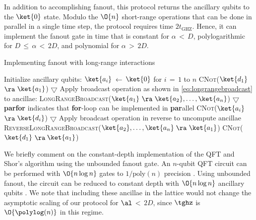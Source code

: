 In addition to accomplishing fanout, this protocol returns the ancillary qubits to the $\ket{0}$ state.
Modulo the $\O{n}$ short-range operations that can be done in parallel in a single time step, the protocol requires time $2 t_\mathrm{GHZ}$.
Hence, it can implement the fanout gate in time that is constant for $\alpha$\,$<$\,$D$, polylogarithmic for $D$\,$\le$\,$\alpha$\,$<$\,$2D$, and polynomial for $\alpha$\,$>$\,$2D$.

\begin{algorithm}[H]
  \caption{Implementing fanout with long-range interactions}
  \label{alg:fastfanout}
  \begin{algorithmic}[1]
   \State Initialize ancillary qubits: $\ket{a_i}$\,$\gets$\,$\ket{0}$ for $i$\,$=$\,$1$ to $n$
  \State \textsc{CNot}($\ket{d_1}$\,$\ra$\,$\ket{a_1}$)
  \Statex $\bigtriangledown$ Apply broadcast operation as shown in \cref{eq:longrangebroadcast} to ancillae:
  \State \textsc{LongRangeBroadcast}($\ket{a_1}$\,$\ra$\,$\ket{a_2},\dots,\ket{a_n}$)
  \Statex $\bigtriangledown$ \textbf{parfor} indicates that \textbf{for}-loop can be implemented in \textbf{par}allel
    \State \textsc{CNot}($\ket{a_i}$\,$\ra$\,$\ket{d_{i}}$)
  \EndParFor
  \Statex $\bigtriangledown$ Apply broadcast operation in reverse to uncompute ancillae
  \State \textsc{ReverseLongRangeBroadcast}($\ket{a_2},\dots,\ket{a_n}$\,$\ra$\,$\ket{a_1}$)
  \State \textsc{CNot}($\ket{d_1}$\,$\ra$\,$\ket{a_1}$)
  \end{algorithmic}
\end{algorithm}

We briefly comment on the constant-depth implementation of the QFT and Shor's algorithm using the unbounded fanout gate.
An $n$-qubit QFT circuit can be performed with $\O{n\log n}$ gates to $1/\text{poly}(n)$ precision \cite{Coppersmith94}.
Using unbounded fanout, the circuit can be reduced to constant depth with $\O{n\log n}$ ancillary qubits \cite{Hoyer2005}.
We note that including these ancillae in the lattice would not change the asymptotic scaling of our protocol for $\al$\,$<$\,$2D$, since $\tghz$ is $\O{\polylog(n)}$ in this regime.

